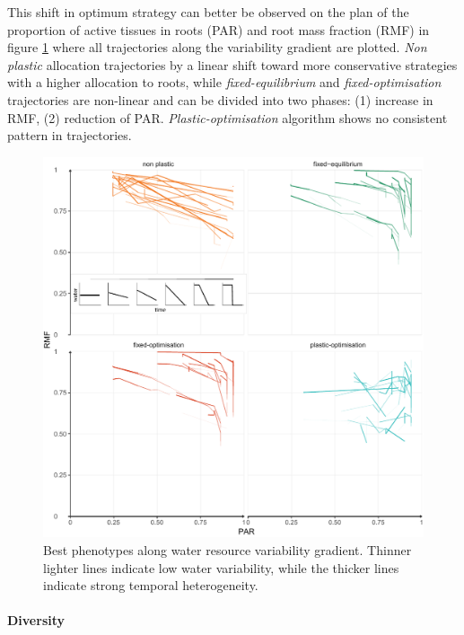  This shift in optimum strategy can better be observed on the plan of the proportion of active tissues in roots (PAR) and root mass fraction (RMF) in figure \ref{fig:variable_trajectories} where all trajectories along the variability gradient are plotted. \textit{Non plastic} allocation trajectories by a linear shift toward more conservative strategies with a higher allocation to roots, while \textit{fixed-equilibrium} and \textit{fixed-optimisation} trajectories are non-linear and can be divided into two phases: (1) increase in RMF, (2) reduction of PAR. \textit{Plastic-optimisation} algorithm shows no consistent pattern in trajectories.


\begin{figure}\label{fig:variable_trajectories}
\includegraphics[width = \textwidth]{./2_PP/Figures/Variable/var_2D_strat_dyn.pdf}
\caption[Best phenotypes along water resource variability gradient]{Best phenotypes along water resource variability gradient. Thinner lighter lines indicate low water variability, while the thicker lines indicate strong temporal heterogeneity.}
\end{figure}

\paragraph{Diversity}


